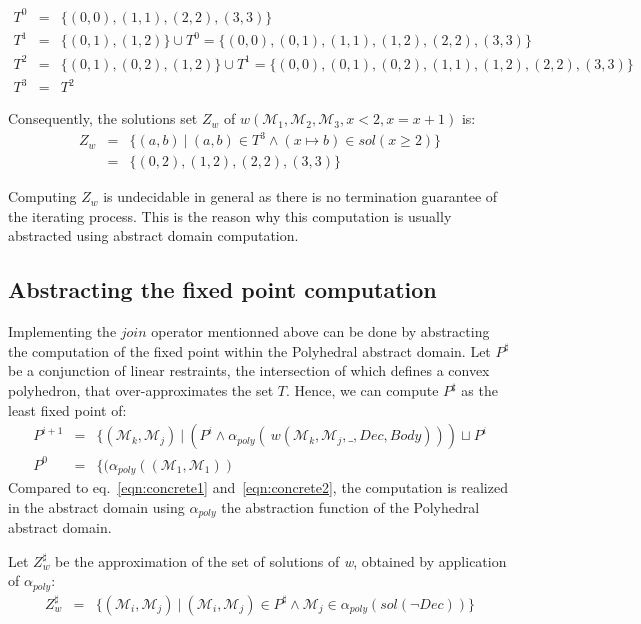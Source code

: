 \documentclass[submission,copyright,creativecommons]{eptcs}
\newcommand{\M}{\mathcal{M}}
\begin{document}
\begin{eqnarray*}
T^0 &=& \{(0,0),(1,1),(2,2),(3,3)\} \\ 
T^1 &=& \{(0,1),(1,2)\} \cup T^0
    = \{(0,0),(0,1),(1,1),(1,2),(2,2),(3,3)\}\\
T^2 &=& \{(0,1),(0,2),(1,2)\} \cup T^1
    = \{(0,0),(0,1),(0,2),(1,1),(1,2),(2,2),(3,3)\}\\
T^3 &=& T^2     
\end{eqnarray*}

\noindent
Consequently, the solutions set $Z_w$ of $w(\M_1, \M_2, \M_3, x < 2, x=x+1)$ is:
\begin{eqnarray*}
  Z_w &=& \{(a,b)~|~(a,b) \in T^3 \land (x \mapsto b) \in sol(x \geq 2)\}  \\
   &=& \{(0,2),(1,2),(2,2),(3,3)\}
\end{eqnarray*}

\noindent
Computing $Z_w$ is undecidable in general as there is no termination guarantee of the iterating process. This is the reason why this computation is usually abstracted using abstract domain computation.

\subsection{Abstracting the fixed point computation}

Implementing the $join$ operator mentionned above can be done by 
abstracting the computation of the fixed point within the Polyhedral abstract domain.
Let $P^\sharp$ be a conjunction of linear restraints, the intersection of which defines a convex polyhedron, that over-approximates the set $T$.
Hence, we can compute $P^\sharp$ as the least fixed point of:
\begin{eqnarray}
P^{i+1} &=& \{(\M_k,\M_j)~|~(P^i \land \alpha_{poly}(~w(\M_k,\M_j,\_,Dec,Body))) \sqcup P^i \label{eqn1}\\
P^0 &=& \{(\alpha_{poly}((\M_1,\M_1))\label{eqn2}
\end{eqnarray}
Compared to eq.~\ref{eqn:concrete1} and~\ref{eqn:concrete2}, the
computation is realized in the abstract domain using $\alpha_{poly}$ the abstraction function of the Polyhedral abstract domain.



\noindent
Let $Z^\sharp_w$ be the approximation of the set of solutions of \textit{w}, obtained by application of $\alpha_{poly}$:
\begin{eqnarray*}
  Z^\sharp_w &=& \{(\M_i,\M_j)~|~ (\M_i,\M_j) \in P^\sharp \land \M_j \in \alpha_{poly}(sol(\lnot Dec))\} 
  \end{eqnarray*}
\end{document}
